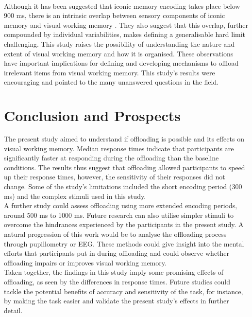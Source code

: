 \documentclass[
    a4paper,
    man,
    floatsintext,
    british
]{apa6}
\begin{document}
\\
Although it has been suggested that iconic memory encoding takes place below 900 ms, there is an intrinsic overlap between sensory components of iconic memory and visual working memory \parencite{bradley_2012_the}. They also suggest that this overlap, further compounded by individual variabilities, makes defining a generalisable hard limit challenging. This study raises the possibility of understanding the nature and extent of visual working memory and how it is organised. These observations have important implications for defining and developing mechanisms to offload irrelevant items from visual working memory. This study's results were encouraging and pointed to the many unanswered questions in the field.
\newpage
\section{Conclusion and Prospects}
The present study aimed to understand if offloading is possible and its effects on visual working memory. Median response times indicate that participants are significantly faster at responding during the offloading than the baseline conditions. The results thus suggest that offloading allowed participants to speed up their response times, however, the sensitivity of their responses did not change. Some of the study's limitations included the short encoding period (300 ms) and the complex stimuli used in this study.
\\
A further study could assess offloading using more extended encoding periods, around 500 ms to 1000 ms. Future research can also utilise simpler stimuli to overcome the hindrances experienced by the participants in the present study. A natural progression of this work would be to analyse the offloading process through pupillometry or EEG. These methods could give insight into the mental efforts that participants put in during offloading and could observe whether offloading impairs or improves visual working memory.  
\\
Taken together, the findings in this study imply some promising effects of offloading, as seen by the differences in response times. Future studies could tackle the potential benefits of accuracy and sensitivity of the task, for instance, by making the task easier and validate the present study's effects in further detail.
\newpage
\printbibliography
\newpage
\end{document}
